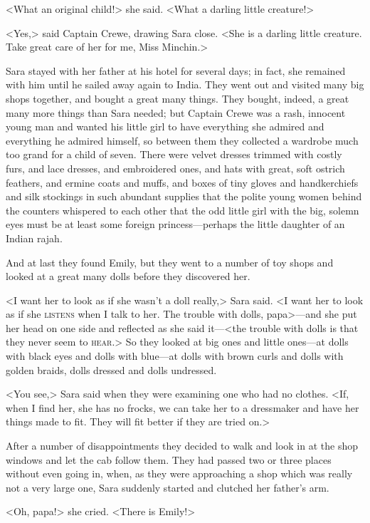 <What an original child!> she said. <What a darling little creature!>

<Yes,> said Captain Crewe, drawing Sara close. <She is a darling little creature. Take great care of her for me, Miss Minchin.>

Sara stayed with her father at his hotel for several days; in fact, she remained with him until he sailed away again to India. They went out and visited many big shops together, and bought a great many things. They bought, indeed, a great many more things than Sara needed; but Captain Crewe was a rash, innocent young man and wanted his little girl to have everything she admired and everything he admired himself, so between them they collected a wardrobe much too grand for a child of seven. There were velvet dresses trimmed with costly furs, and lace dresses, and embroidered ones, and hats with great, soft ostrich feathers, and ermine coats and muffs, and boxes of tiny gloves and handkerchiefs and silk stockings in such abundant supplies that the polite young women behind the counters whispered to each other that the odd little girl with the big, solemn eyes must be at least some foreign princess—perhaps the little daughter of an Indian rajah.

And at last they found Emily, but they went to a number of toy shops and looked at a great many dolls before they discovered her.

<I want her to look as if she wasn't a doll really,> Sara said. <I want her to look as if she \textsc{listens} when I talk to her. The trouble with dolls, papa>—and she put her head on one side and reflected as she said it—<the trouble with dolls is that they never seem to \textsc{hear}.> So they looked at big ones and little ones—at dolls with black eyes and dolls with blue—at dolls with brown curls and dolls with golden braids, dolls dressed and dolls undressed.

<You see,> Sara said when they were examining one who had no clothes. <If, when I find her, she has no frocks, we can take her to a dressmaker and have her things made to fit. They will fit better if they are tried on.>

After a number of disappointments they decided to walk and look in at the shop windows and let the cab follow them. They had passed two or three places without even going in, when, as they were approaching a shop which was really not a very large one, Sara suddenly started and clutched her father's arm.

<Oh, papa!> she cried. <There is Emily!>

